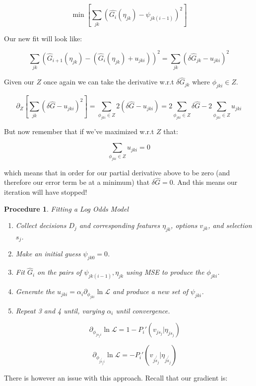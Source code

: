 \documentclass[11pt]{article}
\newtheorem{procedure}{Procedure}
\begin{document}
$$\min{\left[ \sum_{jk}\left(\hat{G_i}(\eta_{jk}) - \psi_{jk(i-1)}\right)^2 \right]}$$

Our new fit will look like:

$$\sum_{jk}\left(\hat{G}_{i+1}(\eta_{jk}) - (\hat{G}_i(\eta_{jk}) + u_{jki})\right)^2=\sum_{jk}\left( \delta \hat{G}_{jk} - u_{jki}\right)^2$$

Given our $Z$ once again we can take the derivative w.r.t $\delta \hat{G}_{jk}$ where $\phi_{jki} \in Z$. 

$$\partial_Z \left[ \sum_{jk}\left( \delta \hat{G} - u_{jki}\right)^2 \right] = \sum_{\phi_{jki} \in Z} 2\left( \delta \hat{G} - u_{jki}\right) = 2\sum_{\phi_{jki} \in Z} \delta \hat{G} - 2\sum_{\phi_{jki} \in Z} u_{jki}$$

But now remember that if we've maximized w.r.t $Z$ that:

$$\sum_{\phi_{jki} \in Z} u_{jki} = 0$$

which means that in order for our partial derivative above to be zero (and therefore our error term be at a minimum) that $\delta \hat{G}=0$. And this means our iteration will have stopped! 

\newpage

\begin{procedure}{Fitting a Log Odds Model}
\begin{enumerate}
\item Collect decisions $D_j$ and corresponding features $\eta_{jk}$, options $v_{jk}$, and selection $s_j$. 
\item Make an initial guess $\psi_{jk0} = 0$.
\item Fit $\hat{G}_i$ on the pairs of $\psi_{jk(i-1)},\eta_{jk}$ using MSE to produce the $\phi_{jki}$.
\item Generate the $u_{jki} = \alpha_i \partial_{\phi_{jki}} \ln{\mathcal{L}}$ and produce a new set of $\psi_{jki}$.
\item Repeat 3 and 4 until, varying $\alpha_i$ until convergence. 

$$\partial_{\phi_{js_ji}}\ln{\mathcal{L}}=1-P_i'(v_{js_j} | \eta_{js_j})$$ 

$$\partial_{\phi_{j\not{s_j}i}}\ln{\mathcal{L}}=-P_i'(v_{j\not{s_j}} | \eta_{j\not{s_j}})$$ 
\end{enumerate}

\end{procedure}

There is however an issue with this approach. Recall that our gradient is:
\end{document}
